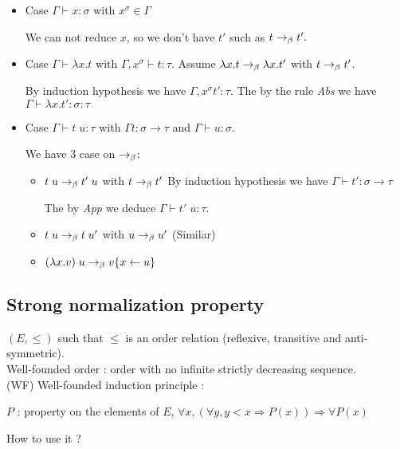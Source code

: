   \begin{itemize}
    \item Case $\Gamma \vdash x : \sigma$ with $x^\sigma \in \Gamma$
      
      We can not reduce $x$, so we don't have $t'$ such as $t\to_\beta t'.$

    \item Case $\Gamma \vdash \lambda x.t$ with $\Gamma, x^\sigma \vdash t :
      \tau$. Assume $\lambda x. t \to_\beta \lambda x. t'$ with $t \to_\beta t'$.

      By induction hypothesis we have $\Gamma, x^\sigma t' : \tau$. The by the
      rule \textit{Abs} we have $\Gamma \vdash \lambda x. t' : \sigma : \tau$

    \item Case $\Gamma \vdash t\;u: \tau$ with $\Gamma t : \sigma \to \tau$ and
      $\Gamma \vdash u : \sigma$.

      We have 3 case on $\to_\beta$:

      \begin{itemize}
        \item $t\;u \to_\beta t'\;u$ with $t \to_\beta t'$ 
          By induction hypothesis we have $\Gamma \vdash t' : \sigma \to \tau$

          The by \textit{App} we deduce $\Gamma \vdash t'\;u: \tau$.

        \item $t\;u \to_\beta t\;u'$ with $u \to_\beta  u'$ (Similar)

        \item $(\lambda x.v)\; u \to_\beta v\{x \leftarrow u\}$
      \end{itemize}
  \end{itemize}
  \qedsymbol

  \subsection{Strong normalization property}

  $(E, \leq)$ such that $\leq$ is an order relation (reflexive, transitive and
  anti-symmetric).\\
  Well-founded order : order with no infinite strictly decreasing sequence. \\
  (WF) Well-founded induction principle :

  $P$ : property on the elements of $E$,
  $\forall x, (\forall y, y < x \Rightarrow P(x)) \Rightarrow \forall P (x)$

  How to use it ?

